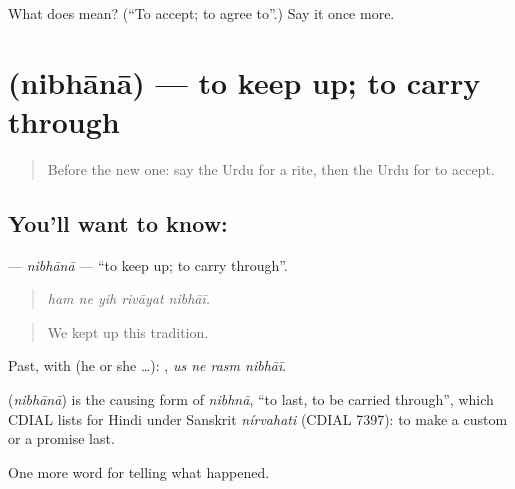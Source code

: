 \begin{tcolorbox}[breakable,colback=teal!4,colframe=teal!35!black,title={Before you move on}]
What does  mean? (\textquotedblleft{}To accept; to agree to\textquotedblright{}.) Say it once more.
\end{tcolorbox}
\section[\texorpdfstring{\ur{نبھانا} (nibhānā)}{نبھانا (nibhānā)}]{ (nibhānā) — to keep up; to carry through}

\label{lesson:UR-C323-nibhana}



\begin{quote}
Before the new one: say the Urdu for a rite, then the Urdu for to accept.
\end{quote}

\subsection*{You'll want to know: }
\textbf{} — \emph{nibhānā} — \textquotedblleft{}to keep up; to carry through\textquotedblright{}.

\begin{quote}
    
\end{quote}

\begin{quote}
\emph{ham ne yih rivāyat nibhāī.}
\end{quote}

\begin{quote}
We kept up this tradition.
\end{quote}

Past, with  (he or she …):    , \emph{us ne rasm nibhāī}.

\begin{cousinweb}
\textbf{} (\emph{nibhānā}) is the causing form of \emph{nibhnā}, \textquotedblleft{}to last, to be carried through\textquotedblright{}, which CDIAL lists for Hindi under Sanskrit \emph{nírvahati} (CDIAL 7397): to make a custom or a promise last.
\end{cousinweb}

\begin{grammarlens}[title={What you've built}]
One more word for telling what happened.
\end{grammarlens}

